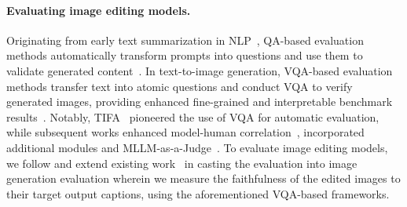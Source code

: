 

\paragraph{Evaluating image editing models.}
Originating from early text summarization in NLP~\citep{Narayan2018RankingSF}, QA-based evaluation methods automatically transform prompts into questions and use them to validate generated content~\citep{Durmus2020FEQAAQ, Deutsch2020TowardsQA, Eyal2019QuestionAA}. 
In text-to-image generation, VQA-based evaluation methods transfer text into atomic questions and conduct VQA to verify generated images, providing enhanced fine-grained and interpretable benchmark results~\citep{cho2023davidsonian, lin2024evaluating, chen2024mllm}.
Notably, TIFA~\citep{hu2023tifa} pioneered the use of VQA for automatic evaluation, while subsequent works enhanced model-human correlation~\citep{yarom2024you, lu2024llmscore}, incorporated additional modules and MLLM-as-a-Judge~\citep{ghosh2024geneval, cho2024visual, ye2024justice, chen2024mllm, ku2023viescore}.
To evaluate image editing models, we follow and extend existing work~\cite{sheynin2024emu} in casting the evaluation into image generation evaluation wherein we measure the faithfulness of the edited images to their target output captions, using the aforementioned VQA-based frameworks.




